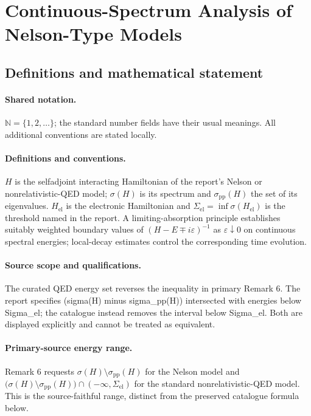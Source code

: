 \documentclass[11pt]{article}
\begin{document}
\section{Continuous-Spectrum Analysis of Nelson-Type Models}\label{statement}

\subsection{Definitions and mathematical statement}

\paragraph{Shared notation.}$\mathbb N=\{1,2,\ldots\}$; the standard number fields have their usual meanings. All additional conventions are stated locally.


\paragraph{Definitions and conventions.} $H$ is the selfadjoint interacting Hamiltonian of the report's Nelson or nonrelativistic-QED model; $\sigma(H)$ is its spectrum and $\sigma_{\mathrm{pp}}(H)$ the set of its eigenvalues. $H_{\mathrm{el}}$ is the electronic Hamiltonian and $\Sigma_{\mathrm{el}}=\inf\sigma(H_{\mathrm{el}})$ is the threshold named in the report. A limiting-absorption principle establishes suitably weighted boundary values of $(H-E\mp i\varepsilon)^{-1}$ as $\varepsilon\downarrow0$ on continuous spectral energies; local-decay estimates control the corresponding time evolution.

\paragraph{Source scope and qualifications.} The curated QED energy set reverses the inequality in primary Remark 6. The report specifies (sigma(H) minus sigma\_pp(H)) intersected with energies below Sigma\_el; the catalogue instead removes the interval below Sigma\_el. Both are displayed explicitly and cannot be treated as equivalent.

\paragraph{Primary-source energy range.} Remark 6 requests $\sigma(H)\setminus\sigma_{\mathrm{pp}}(H)$ for the Nelson model and $\bigl(\sigma(H)\setminus\sigma_{\mathrm{pp}}(H)\bigr)\cap(-\infty,\Sigma_{\mathrm{el}})$ for the standard nonrelativistic-QED model. This is the source-faithful range, distinct from the preserved catalogue formula below.
\end{document}
